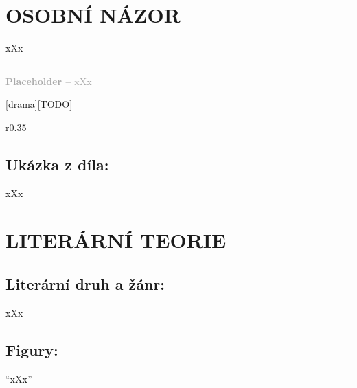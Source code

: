 \documentclass{extarticle} %
\begin{document}


\section*{OSOBNÍ NÁZOR}
\noindent 
xXx

\vfill

\noindent\begin{minipage}{\textwidth}
    \textcolor{darkgray}{\rule{\linewidth}{0.4pt}
    \footnotesize
    \textbf{Placeholder --} xXx
    }
\end{minipage}

\newpage


\changefontsize{8pt}

[drama][TODO]

\noindent\begin{wrapfigure}{r}{0.35\textwidth}
\tiny

\subsection*{Ukázka z díla:}
\setlength{\parindent}{3pt}
xXx
\end{wrapfigure}

\section*{LITERÁRNÍ TEORIE}

\subsection*{Literární druh a žánr:}
\noindent xXx



\subsection*{Figury:}
\noindent 
\enquote{xXx}
\end{document}
